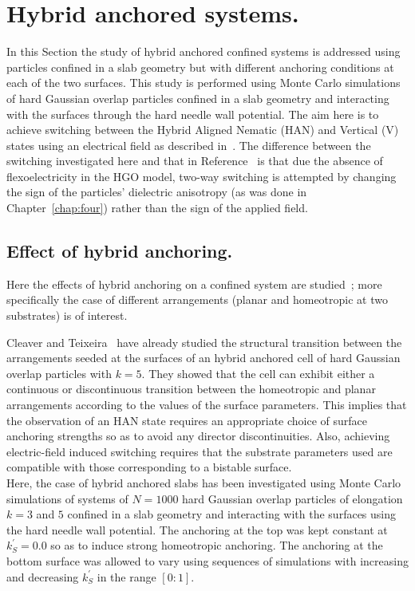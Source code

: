 

\section{Hybrid anchored systems.}
\label{s:hybridSystems}


In this Section the study of hybrid anchored confined systems is addressed using particles
confined in a slab geometry but with different anchoring conditions at each of the two surfaces.
This study is performed using Monte Carlo simulations of hard Gaussian overlap particles
confined in a slab geometry and interacting with the surfaces through the hard needle wall
potential. The aim here is to achieve switching between the Hybrid Aligned Nematic (HAN) and
Vertical (V) states using an electrical field as described in~\cite{DavidsonMottram02}. The
difference between the switching investigated here and that in
Reference~\cite{DavidsonMottram02} is that due the absence of flexoelectricity
in the HGO model, two-way switching is attempted by changing the sign of the particles'
dielectric anisotropy (as was done in Chapter~\ref{chap:four}) rather than the sign of the
applied field.

\subsection{Effect of hybrid anchoring.}
\label{ss:hybridEffect}

Here the effects of hybrid anchoring on a confined system are studied~; more
specifically the case of different arrangements (\ie planar and homeotropic at two substrates)
is of interest.

Cleaver and Teixeira~\cite{Cleaver_Teixeira_01} have already studied the structural transition
between the arrangements seeded at the surfaces of an hybrid anchored cell of hard Gaussian
overlap particles with $k=5$. They showed that the cell can exhibit either a continuous or
discontinuous transition between the homeotropic and planar arrangements according to the values
of the surface parameters. This implies that the observation of an HAN state requires an
appropriate choice of surface anchoring strengths so as to avoid any director discontinuities.
Also, achieving electric-field induced switching requires that the substrate parameters used
are compatible with those corresponding to a bistable surface.\\
%
Here, the case of hybrid anchored slabs has been investigated using Monte Carlo simulations
of systems of $N=1000$ hard Gaussian overlap particles of elongation $k=3$ and $5$
confined in a slab geometry and interacting with  the surfaces  using the hard needle
wall potential. The anchoring at the top was kept constant at $k^\prime_S=0.0$ so as to
induce strong homeotropic anchoring. The anchoring at the bottom surface was allowed to
vary using sequences of simulations with increasing and decreasing $k^\prime_S$ in the range
$[0:1]$.\\



